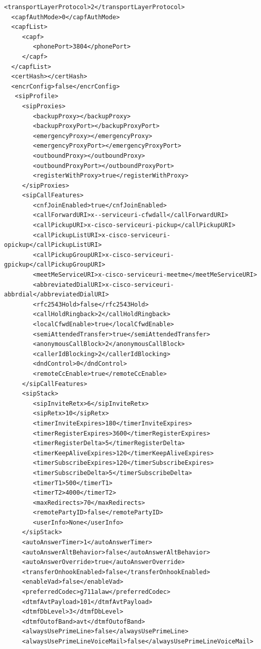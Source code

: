\documentclass[a4paper,12pt]{scrbook}
\begin{document}
\begin{lstlisting}[caption={SEP\textbf{0012345678DE}.cnf.xml}, label=lst:cisco7961sep0012345678decnfxml]
  <transportLayerProtocol>2</transportLayerProtocol>
  <capfAuthMode>0</capfAuthMode>
  <capfList>
     <capf>
        <phonePort>3804</phonePort>
     </capf>
  </capfList>
  <certHash></certHash>
  <encrConfig>false</encrConfig>
   <sipProfile>
     <sipProxies>
        <backupProxy></backupProxy>
        <backupProxyPort></backupProxyPort>
        <emergencyProxy></emergencyProxy>
        <emergencyProxyPort></emergencyProxyPort>
        <outboundProxy></outboundProxy>
        <outboundProxyPort></outboundProxyPort>
        <registerWithProxy>true</registerWithProxy>
     </sipProxies>
     <sipCallFeatures>
        <cnfJoinEnabled>true</cnfJoinEnabled>
        <callForwardURI>x--serviceuri-cfwdall</callForwardURI>
        <callPickupURI>x-cisco-serviceuri-pickup</callPickupURI>
        <callPickupListURI>x-cisco-serviceuri-opickup</callPickupListURI>
        <callPickupGroupURI>x-cisco-serviceuri-gpickup</callPickupGroupURI>
        <meetMeServiceURI>x-cisco-serviceuri-meetme</meetMeServiceURI>
        <abbreviatedDialURI>x-cisco-serviceuri-abbrdial</abbreviatedDialURI>
        <rfc2543Hold>false</rfc2543Hold>
        <callHoldRingback>2</callHoldRingback>
        <localCfwdEnable>true</localCfwdEnable>
        <semiAttendedTransfer>true</semiAttendedTransfer>
        <anonymousCallBlock>2</anonymousCallBlock>
        <callerIdBlocking>2</callerIdBlocking>
        <dndControl>0</dndControl>
        <remoteCcEnable>true</remoteCcEnable>
     </sipCallFeatures>
     <sipStack>
        <sipInviteRetx>6</sipInviteRetx>
        <sipRetx>10</sipRetx>
        <timerInviteExpires>180</timerInviteExpires>
        <timerRegisterExpires>3600</timerRegisterExpires>
        <timerRegisterDelta>5</timerRegisterDelta>
        <timerKeepAliveExpires>120</timerKeepAliveExpires>
        <timerSubscribeExpires>120</timerSubscribeExpires>
        <timerSubscribeDelta>5</timerSubscribeDelta>
        <timerT1>500</timerT1>
        <timerT2>4000</timerT2>
        <maxRedirects>70</maxRedirects>
        <remotePartyID>false</remotePartyID>
        <userInfo>None</userInfo>
     </sipStack>
     <autoAnswerTimer>1</autoAnswerTimer>
     <autoAnswerAltBehavior>false</autoAnswerAltBehavior>
     <autoAnswerOverride>true</autoAnswerOverride>
     <transferOnhookEnabled>false</transferOnhookEnabled>
     <enableVad>false</enableVad>
     <preferredCodec>g711alaw</preferredCodec>
     <dtmfAvtPayload>101</dtmfAvtPayload>
     <dtmfDbLevel>3</dtmfDbLevel>
     <dtmfOutofBand>avt</dtmfOutofBand>
     <alwaysUsePrimeLine>false</alwaysUsePrimeLine>
     <alwaysUsePrimeLineVoiceMail>false</alwaysUsePrimeLineVoiceMail>

\end{lstlisting}
\end{document}
